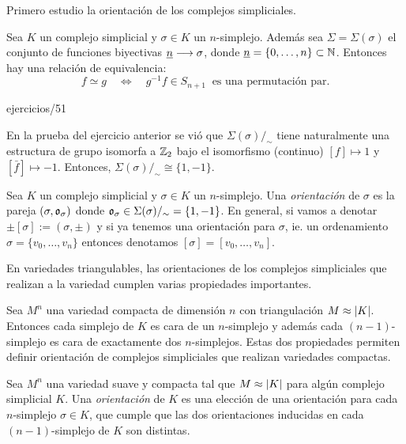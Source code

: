 \documentclass[../../topologia_algebraica]{subfiles}
\begin{document}
Primero estudio la orientaci\'on de los complejos simpliciales.

\begin{defin}
  Sea $K$ un complejo simplicial y $\sigma\in K$ un $n$-simplejo. Adem\'as sea $\Sigma=\Sigma(\sigma)$
  el conjunto de funciones biyectivas $\underline{n}\longrightarrow\sigma$, donde
  $\underline{n}=\{0,\ldots,n\}\subset\mathbb{N}$. Entonces hay una relaci\'on de equivalencia:
  \[
    f \simeq g \quad\iff\quad g^{-1}f\in S_{n+1}\;\;\text{es una permutaci\'on par.}
  \]
\end{defin}

{ejercicios/51} %

En la prueba del ejercicio anterior se vi\'o que $\Sigma(\sigma)/_{\sim}$ tiene naturalmente
una estructura de grupo isomorfa a $\mathbb{Z}_{2}$ bajo el isomorfismo (continuo) $[f]\mapsto1$ y
$[\bar{f}]\mapsto-1$. Entonces, $\Sigma(\sigma)/_{\sim}\cong\{1,-1\}$.

\begin{defin}
  Sea $K$ un complejo simplicial y $\sigma\in K$ un $n$-simplejo. Una \emph{orientaci\'on} de
  $\sigma$ es la pareja $(\sigma,\mathfrak{o}_{\sigma})$ donde $\mathfrak{o}_{\sigma}\in\Sigma(\sigma)/_{\sim}=\{1,-1\}$.
  En general, si vamos a denotar $\pm[\sigma]:=(\sigma,\pm)$ y si ya tenemos una orientaci\'on para
  $\sigma$, ie. un ordenamiento $\sigma=\{v_0,\ldots,v_n\}$ entonces denotamos $[\sigma]=[v_0,\ldots,v_n]$.
\end{defin}

En variedades triangulables, las orientaciones de los complejos simpliciales que realizan a la variedad
cumplen varias propiedades importantes.

Sea $M^n$ una variedad compacta de dimensi\'on $n$ con triangulaci\'on $M\approx\left| K \right|$. Entonces
cada simplejo de $K$ es cara de un $n$-simplejo y adem\'as cada $(n-1)$-simplejo es cara de
exactamente dos $n$-simplejos. Estas dos propiedades permiten definir orientaci\'on de complejos
simpliciales que realizan variedades compactas.

\begin{defin}
  Sea $M^n$ una variedad suave y compacta tal que $M\approx\left| K \right|$ para alg\'un complejo
  simplicial $K$. Una \emph{orientaci\'on} de $K$ es una elecci\'on de una orientaci\'on
  para cada $n$-simplejo $\sigma\in K$, que cumple que las dos orientaciones inducidas en cada
  $(n-1)$-simplejo de $K$ son distintas.
\end{defin}
\end{document}
